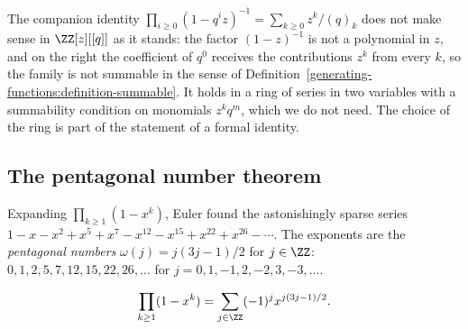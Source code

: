 \begin{counterexample}\label{generating-functions:counterexample-two-variables}
The companion identity $\prod_{i \geq 0}(1 - q^iz)^{-1} = \sum_{k \geq 0}z^k/(q)_k$ does not make sense in $\ZZ[z][[q]]$ as it stands: the factor $(1 - z)^{-1}$ is not a polynomial in $z$, and on the
right the coefficient of $q^0$ receives the contributions $z^k$ from every $k$, so the family is not summable in the sense of Definition~\ref{generating-functions:definition-summable}. It holds in a
ring of series in two variables with a summability condition on monomials $z^kq^m$, which we do not need. The choice of the ring is part of the statement of a formal identity.
\end{counterexample}

\subsection{The pentagonal number theorem}\label{generating-functions:subsection-pentagonal}

Expanding $\prod_{k \geq 1}(1 - x^k)$, Euler found the astonishingly sparse series $1 - x - x^2 + x^5 + x^7 - x^{12} - x^{15} + x^{22} + x^{26} - \cdots$. The exponents are the
\emph{pentagonal numbers} $\omega(j) = j(3j - 1)/2$ for $j \in \ZZ$: $0, 1, 2, 5, 7, 12, 15, 22, 26, \ldots$ for $j = 0, 1, -1, 2, -2, 3, -3, \ldots$.

\begin{theorem}\label{generating-functions:theorem-pentagonal}
\[
\prod_{k \geq 1}(1 - x^k) = \sum_{j \in \ZZ}(-1)^jx^{j(3j-1)/2}.
\]
\end{theorem}

